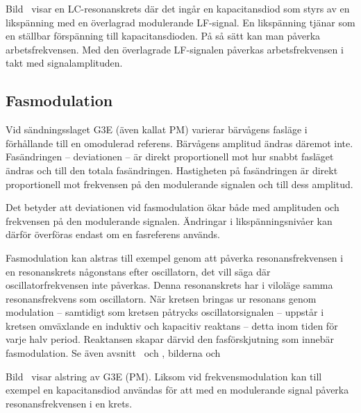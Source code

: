 
Bild~ visar en LC-resonanskrets där det ingår en
kapacitansdiod som styrs av en likspänning med en överlagrad modulerande LF-signal.
En likspänning tjänar som en ställbar förspänning till kapacitansdioden.
På så sätt kan man påverka arbetsfrekvensen.
Med den överlagrade LF-signalen påverkas arbetsfrekvensen i takt med
signalamplituden.

\subsection{Fasmodulation}

Vid sändningsslaget G3E (även kallat PM) varierar bärvågens fasläge i
förhållande till en omodulerad referens.
Bärvågens amplitud ändras däremot inte.
Fasändringen -- deviationen -- är direkt proportionell mot hur snabbt fasläget
ändras och till den totala fasändringen.
Hastigheten på fasändringen är direkt proportionell mot frekvensen på den
modulerande signalen och till dess amplitud.

Det betyder att deviationen vid fasmodulation ökar både med amplituden
och frekvensen på den modulerande signalen.
Ändringar i likspänningsnivåer kan därför överföras endast om en fasreferens
används.

Fasmodulation kan alstras till exempel genom att påverka resonansfrekvensen i
en resonanskrets någonstans efter oscillatorn, det vill säga där
oscillatorfrekvensen inte påverkas.
Denna resonanskrets har i viloläge samma resonansfrekvens som oscillatorn.
När kretsen bringas ur resonans genom modulation -- samtidigt som kretsen
påtrycks oscillatorsignalen -- uppstår i kretsen omväxlande en induktiv och
kapacitiv reaktans -- detta inom tiden för varje halv period.
Reaktansen skapar därvid den fasförskjutning som innebär fasmodulation.
Se även avsnitt~ och , bilderna
 och 


Bild~ visar alstring av G3E (PM).
Liksom vid frekvensmodulation kan till exempel en kapacitansdiod användas för att
med en modulerande signal påverka resonansfrekvensen i en krets.
